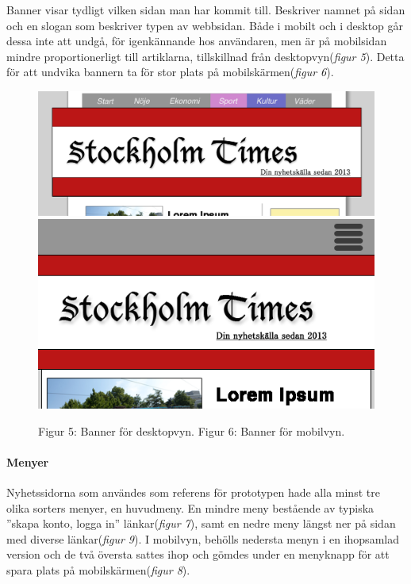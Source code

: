 \documentclass[11pt]{article}
\begin{document}
Banner visar tydligt vilken sidan man har kommit till. Beskriver namnet på sidan och en slogan som beskriver typen av webbsidan. Både i mobilt och i desktop går dessa inte att undgå, för igenkännande hos användaren, men är på mobilsidan mindre proportionerligt till artiklarna, tillskillnad från desktopvyn(\textit{figur 5}). Detta för att undvika bannern ta för stor plats på mobilskärmen(\textit{figur 6}).
\\
\begin{figure}[H]
\centerline{%
\includegraphics[scale=0.258]{pics/bannerdesktop.png}\hspace{2em}%
\includegraphics[scale=0.40]{pics/bannermobil.png}%
}
\vspace{0.3cm}
\hspace{0.15cm}Figur 5: Banner för desktopvyn.\hspace{4.4cm} Figur 6: Banner för mobilvyn.

\end{figure}

\paragraph{Menyer}\mbox{}

Nyhetssidorna som användes som referens för prototypen hade alla minst tre olika sorters menyer, en huvudmeny. En mindre meny bestående av typiska ”skapa konto, logga in” länkar(\textit{figur 7}), samt en nedre meny längst ner på sidan med diverse länkar(\textit{figur 9}). I mobilvyn, behölls nedersta menyn i en ihopsamlad version och de två översta sattes ihop och gömdes under en menyknapp för att spara plats på mobilskärmen(\textit{figur 8}).
\\
\end{document}
